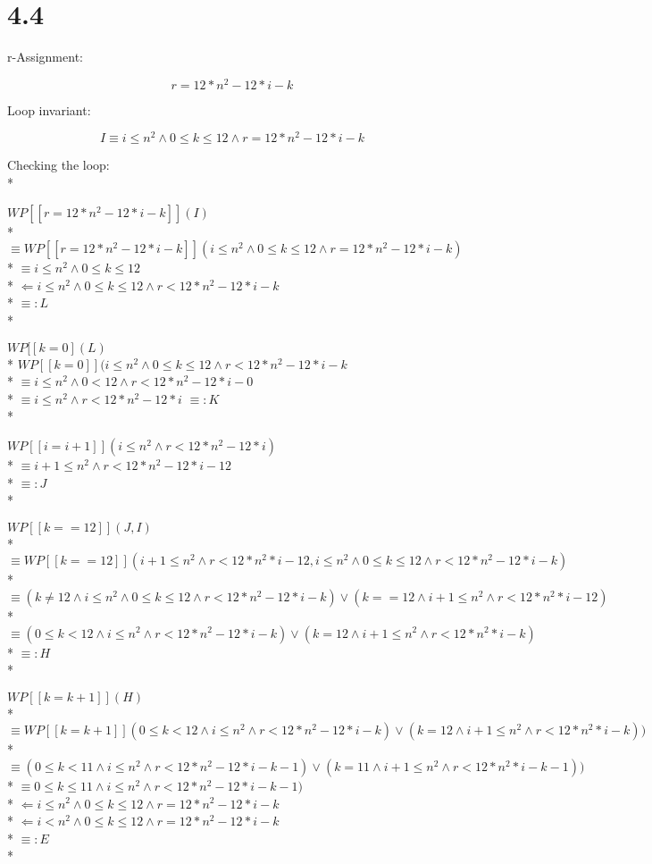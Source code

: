 \documentclass{article}
\begin{document}
\section*{4.4}

r-Assignment:

$$ r=12*n^2-12*i-k $$

Loop invariant:

$$ I\equiv i\le n^2 \land 0\le k\le 12 \land r=12*n^2-12*i-k $$

Checking the loop: \\*

$ WP[\![r=12*n^2-12*i-k]\!](I) $ \\*
$ \equiv WP[\![r=12*n^2-12*i-k]\!](i \le n^2 \land 0\le k\le 12 \land r=12*n^2-12*i-k) $ \\*
$ \equiv i \le n^2 \land 0\le k\le 12 $ \\*
$ \Leftarrow i \le n^2 \land 0\le k\le 12 \land r<12*n^2-12*i-k $ \\*
$ \equiv: L $ \\*

$ WP[\![k=0]\!(L) $ \\*
$ WP[\![k=0]\!](i \le n^2 \land 0\le k\le 12 \land r<12*n^2-12*i-k $ \\*
$ \equiv i \le n^2 \land 0<12 \land r<12*n^2-12*i-0 $ \\*
$ \equiv i \le n^2 \land r<12*n^2-12*i $
$ \equiv: K $ \\*

$ WP[\![i=i+1]\!](i \le n^2 \land r<12*n^2-12*i) $ \\*
$ \equiv i+1 \le n^2 \land r<12*n^2-12*i-12 $ \\*
$ \equiv: J $ \\*

$ WP[\![k==12]\!](J, I) $ \\*
$ \equiv WP[\![k==12]\!](i+1 \le n^2 \land r<12*n^2*i-12, i \le n^2 \land 0\le k\le 12 \land r<12*n^2-12*i-k) $ \\*
$ \equiv (k\ne 12 \land i \le n^2 \land 0\le k\le 12 \land r<12*n^2-12*i-k) \lor (k==12 \land i+1 \le n^2 \land r<12*n^2*i-12) $ \\*
$ \equiv (0\le k<12 \land i \le n^2 \land r<12*n^2-12*i-k) \lor (k=12 \land i+1 \le n^2 \land r<12*n^2*i-k) $ \\*
$ \equiv: H $ \\*

$ WP[\![k=k+1]\!](H) $ \\*
$ \equiv WP[\![k=k+1]\!](0\le k<12 \land i \le n^2 \land r<12*n^2-12*i-k) \lor (k=12 \land i+1 \le n^2 \land r<12*n^2*i-k)) $ \\*
$ \equiv (0\le k<11 \land i \le n^2 \land r<12*n^2-12*i-k-1) \lor (k=11 \land i+1 \le n^2 \land r<12*n^2*i-k-1)) $ \\*
$ \equiv 0\le k\le 11 \land i \le n^2 \land r<12*n^2-12*i-k-1) $ \\*
$ \Leftarrow i \le n^2 \land 0 \le k \le 12 \land r=12 *n^2 -12*i-k $ \\*
$ \Leftarrow i<n^2 \land 0\le k\le 12 \land r=12*n^2-12*i-k $ \\*
$ \equiv: E $ \\*
\end{document}
